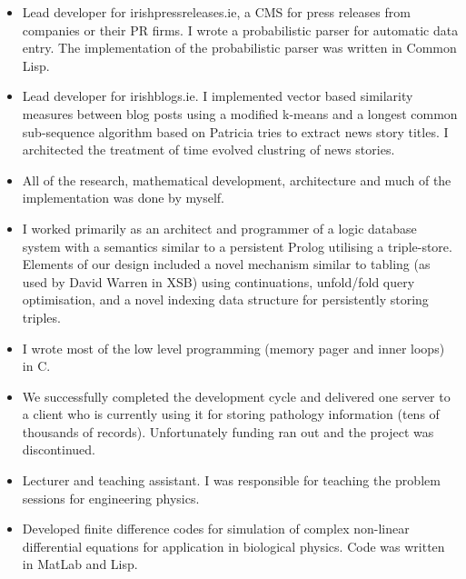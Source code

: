 \documentclass[a4paper,11pt]{moderncv}
\begin{document}
{
  \begin{itemize}
  \item Lead developer for irishpressreleases.ie, a CMS for press releases from companies or their PR firms. I wrote a probabilistic parser for automatic data entry. The implementation of the probabilistic parser was written in Common Lisp.
  \item Lead developer for irishblogs.ie. I implemented vector based similarity measures between blog posts using a modified k-means and a longest common sub-sequence algorithm based on Patricia tries to extract news story titles. I architected the treatment of time evolved clustring of news stories. 
  \item All of the research, mathematical development, architecture and much of the implementation was done by myself.
  \end{itemize}
}

{
  \begin{itemize}
  \item I worked primarily as an architect and programmer of a logic database system with a semantics similar to a persistent Prolog utilising a triple-store. Elements of our design included a novel mechanism similar to tabling (as used by David Warren in XSB) using continuations, unfold/fold query optimisation, and a novel indexing data structure for persistently storing triples.
  \item I wrote most of the low level programming (memory pager and inner loops) in C.
  \item We successfully completed the development cycle and delivered one server to a client who is currently using it for storing pathology information (tens of thousands of records). Unfortunately funding ran out and the project was discontinued.
  \end{itemize}
}

{
  \begin{itemize}
  \item Lecturer and teaching assistant. I was responsible for teaching the problem sessions for engineering physics.
  \end{itemize}
}

{
  \begin{itemize}
  \item Developed finite difference codes for simulation of complex non-linear differential equations for application in biological physics. Code was written in MatLab and Lisp.
  \end{itemize}
}
\end{document}

